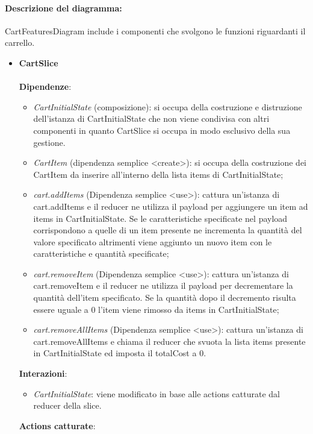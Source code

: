 \paragraph*{Descrizione del diagramma:}
CartFeaturesDiagram include i componenti che svolgono le funzioni riguardanti il carrello.
\begin{itemize}
		\item \textbf{CartSlice}
		\\\\
		\textbf{Dipendenze}:
		\begin{itemize}
			\item \textit{CartInitialState} (composizione): si occupa della costruzione e distruzione dell'istanza di CartInitialState
			che non viene condivisa con altri componenti in quanto CartSlice si occupa in modo esclusivo della sua gestione.
			\item \textit{CartItem} (dipendenza semplice \textless create\textgreater): si occupa della costruzione dei CartItem 
			da inserire all'interno della lista items di CartInitialState;
			\item \textit{cart.addItems} (Dipendenza semplice \textless use\textgreater): cattura un'istanza di cart.addItems e il 
			reducer ne utilizza il payload per aggiungere un item ad items in CartInitialState.
			Se le caratteristiche specificate nel payload corrispondono a quelle di un item presente ne incrementa la quantità 
			del valore specificato altrimenti viene aggiunto un nuovo item con le caratteristiche e quantità specificate;  
			\item \textit{cart.removeItem} (Dipendenza semplice \textless use\textgreater): cattura un'istanza di cart.removeItem e il reducer
			ne utilizza il payload per decrementare la quantità dell'item specificato.
			Se la quantità dopo il decremento risulta essere uguale a 0 l'item viene rimosso da items in CartInitialState;
			\item \textit{cart.removeAllItems} (Dipendenza semplice \textless use\textgreater): cattura un'istanza di cart.removeAllItems e chiama il reducer 
			che svuota la lista items presente in CartInitialState ed imposta il totalCost a 0.
		\end{itemize}
		\textbf{Interazioni}:
		\begin{itemize}
			\item \textit{CartInitialState}: viene modificato in base alle actions catturate dal reducer della slice.
		\end{itemize}
		\textbf{Actions catturate}:
		\begin{itemize}

\end{itemize}
\end{itemize}
